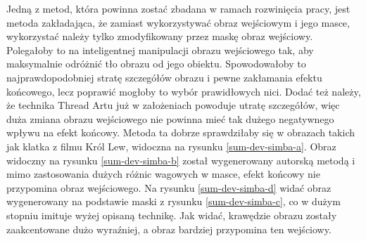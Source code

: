 \documentclass[a4paper, 12pt, polish, twoside]{extreport}
\begin{document}
    Jedną z metod, która powinna zostać zbadana w ramach rozwinięcia pracy, jest metoda zakładająca, że zamiast wykorzystywać obraz wejściowym i jego masce, wykorzystać należy tylko zmodyfikowany przez maskę obraz wejściowy. Polegałoby to na inteligentnej manipulacji obrazu wejściowego tak, aby maksymalnie odróżnić tło obrazu od jego obiektu. Spowodowałoby to najprawdopodobniej stratę szczegółów obrazu i pewne zakłamania efektu końcowego, lecz poprawić mogłoby to wybór prawidłowych nici. Dodać też należy, że technika Thread Artu już w założeniach powoduje utratę szczegółów, więc duża zmiana obrazu wejściowego nie powinna mieć tak dużego negatywnego wpływu na efekt końcowy. Metoda ta dobrze sprawdziłaby się w obrazach takich jak klatka z filmu Król Lew, widoczna na rysunku \ref{sum-dev-simba-a}. Obraz widoczny na rysunku \ref{sum-dev-simba-b} został wygenerowany autorską metodą i mimo zastosowania dużych różnic wagowych w masce, efekt końcowy nie przypomina obraz wejściowego. Na rysunku \ref{sum-dev-simba-d} widać obraz wygenerowany na podstawie maski z rysunku \ref{sum-dev-simba-c}, co w dużym stopniu imituje wyżej opisaną technikę. Jak widać, krawędzie obrazu zostały zaakcentowane dużo wyraźniej, a obraz bardziej przypomina ten wejściowy.
\end{document}

